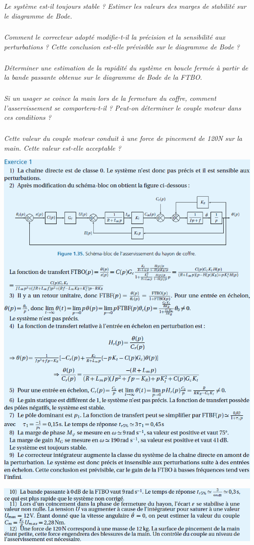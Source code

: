 \documentclass[10pt,fleqn]{article} %
\begin{document}
\begin{multicols}{2}
\subparagraph{}\textit{Le système est-il toujours stable ? Estimer les valeurs des marges de stabilité sur le diagramme
de Bode.}

\subparagraph{}\textit{Comment le correcteur adopté modifie-t-il la précision et la sensibilité aux perturbations ?
Cette conclusion est-elle prévisible sur le diagramme de Bode ?}

\subparagraph{}\textit{Déterminer une estimation de la rapidité du système en boucle fermée à partir de la bande
passante obtenue sur le diagramme de Bode de la FTBO.}

\subparagraph{}\textit{Si un usager se coince la main lors de la fermeture du coffre, comment l’asservissement se
comportera-t-il ? Peut-on déterminer le couple moteur dans ces conditions ?}

\subparagraph{}\textit{Cette valeur du couple moteur conduit à une force de pincement de 120N sur la main. Cette
valeur est-elle acceptable ?}

\end{multicols}


\newpage

\begin{center}
\includegraphics[width=\linewidth]{images/cor_01}
\end{center}


\begin{center}
\includegraphics[width=\linewidth]{images/cor_02}
\end{center}
\end{document}
